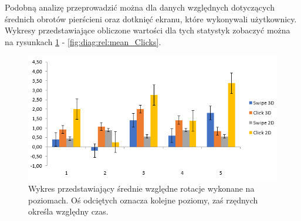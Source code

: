 \documentclass[a4paper,12pt,numbers=noenddot]{report}
\begin{document}
Podobną analizę przeprowadzić można dla danych względnych dotyczących średnich obrotów pierścieni oraz dotknięć ekranu, które wykonywali użytkownicy. Wykresy przedstawiające obliczone wartości dla tych statystyk zobaczyć można na rysunkach \ref{fig:diag:rel:mean_Rotations} - \ref{fig:diag:rel:mean_Clicks}.

\begin{figure}[h!]
	\centering
  	\includegraphics[width=0.9\linewidth]{diag/rel_mean_rotations.png}
	\caption{Wykres przedstawiający średnie względne rotacje wykonane na poziomach. Oś odciętych oznacza kolejne poziomy, zaś rzędnych określa względny czas.}
	\label{fig:diag:rel:mean_Rotations}
\end{figure}
\end{document}

